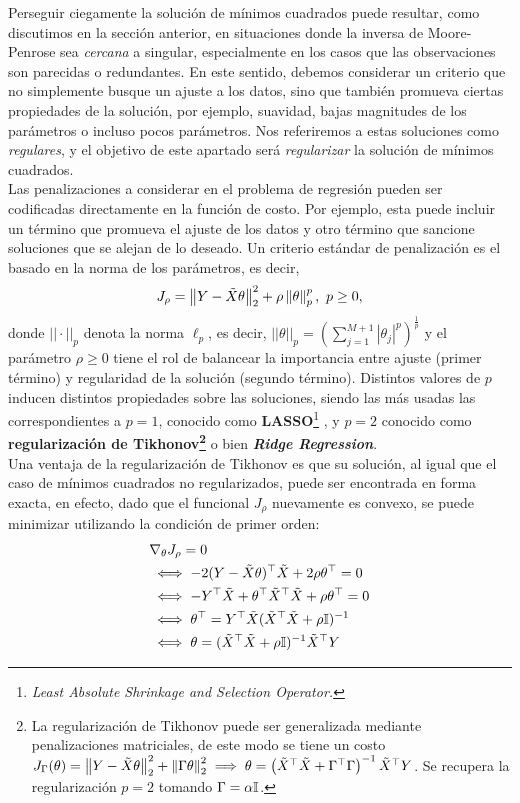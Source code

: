 Perseguir ciegamente la solución de mínimos cuadrados puede resultar, como discutimos en la sección anterior, en situaciones donde la inversa de Moore-Penrose sea \emph{cercana} a singular, especialmente en los casos que las observaciones son parecidas o redundantes. En este sentido, debemos considerar un criterio que no simplemente busque un ajuste a los datos, sino que también promueva ciertas propiedades de la solución, por ejemplo, suavidad, bajas magnitudes de los parámetros o incluso pocos parámetros. Nos referiremos a estas soluciones como \emph{regulares}, y el objetivo de este apartado será \emph{regularizar} la solución de mínimos cuadrados.\\

Las penalizaciones a considerar en el problema de regresión pueden ser codificadas directamente en la función de costo. Por ejemplo, esta puede incluir un término que promueva el ajuste de los datos y otro término que sancione soluciones que se alejan de lo deseado. Un criterio estándar de penalización es el basado en la norma de los parámetros, es decir, 
\begin{equation}
	J_\rho = \left\lVert Y-\tilde{X}\theta\right\rVert_2^2 + \rho\left\lVert\theta\right\rVert_p^p,\ p\geq 0,
	\label{eq:reg_least_squares}
\end{equation} 
donde $||\cdot||_p$ denota la norma $\ell_p$, es decir, $||\theta||_p=\left(\sum\limits_{j=1}^{M+1}|\theta_j|^p\right)^\frac{1}{p}$ y el parámetro $\rho\geq0$ tiene el rol de balancear la importancia entre ajuste (primer término) y regularidad de la solución (segundo término). Distintos valores de $p$ inducen distintos propiedades sobre las soluciones, siendo las más usadas las correspondientes a $p=1$, conocido como \textbf{LASSO}\footnote{\emph{Least Absolute Shrinkage and Selection Operator.}} \cite{tibshirani_1996}, y $p=2$ conocido como \textbf{regularización de Tikhonov\footnote{La regularización de Tikhonov puede ser generalizada mediante penalizaciones matriciales, de este modo se tiene un costo $J_\Gamma(\theta)=\left\lVert Y-\tilde{X}\theta\right\rVert_2^2 + \left\lVert\Gamma\theta\right\rVert_2^2  \implies \theta = \left(\tilde{X}^\top\tilde{X} +\Gamma^\top\Gamma\right)^{-1} \tilde{X}^\top Y$. Se recupera la regularización $p=2$ tomando $\Gamma = \alpha{\mathbb I}$.}} \cite{tikhonov_arsenin_1977} o bien \textbf{\emph{Ridge Regression}}.\\  

Una ventaja de la regularización de Tikhonov es que su solución, al igual que el caso de mínimos cuadrados no regularizados, puede ser encontrada en forma exacta, en efecto, dado que el funcional $J_\rho$ nuevamente es convexo, se puede minimizar utilizando la condición de primer orden:
\begin{align}
	&\nabla_\theta J_\rho = 0\nonumber\\
	&\iff -2(Y-\tilde{X}\theta)^\top\tilde{X} + 2\rho\theta^\top =0\nonumber\\
	&\iff -Y^\top\tilde{X} +\theta^\top\tilde{X}^\top\tilde{X} + \rho\theta^\top= 0\nonumber\\
	&\iff \theta^\top = Y^\top \tilde{X}(\tilde{X}^\top\tilde{X} + \rho{\mathbb I})^{-1}\nonumber\\
	&\iff \theta = (\tilde{X}^\top\tilde{X}+\rho{\mathbb I})^{-1}\tilde{X}^\top Y
\end{align}

